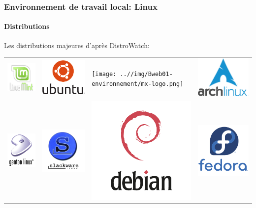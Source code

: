 \documentclass{beamer}
\begin{document}
\begin{frame}
\frametitle{Environnement de travail local: Linux}
\framesubtitle{Distributions}

Les distributions majeures d'après DistroWatch: %

\begin{tabular}{llll}
	\includegraphics[width=.2\textwidth]{..//img/Bweb01-environnement/mint-logo.png} & \includegraphics[width=.2\textwidth]{..//img/Bweb01-environnement/ubuntu-logo.png} & 
	\texttt{[image: ..//img/Bweb01-environnement/mx-logo.png]} &
	\includegraphics[width=.2\textwidth]{..//img/Bweb01-environnement/arch-logo.png} \\
	
	\includegraphics[width=.2\textwidth]{..//img/Bweb01-environnement/gentoo-logo.png} & 
	\includegraphics[width=.2\textwidth]{..//img/Bweb01-environnement/slackware-logo.png} &
	\includegraphics[width=.2\textwidth]{..//img/Bweb01-environnement/debian-logo.png} & 
	\includegraphics[width=.2\textwidth]{..//img/Bweb01-environnement/fedora-logo.png} \\
	

\end{tabular}
\end{frame}
\end{document}
